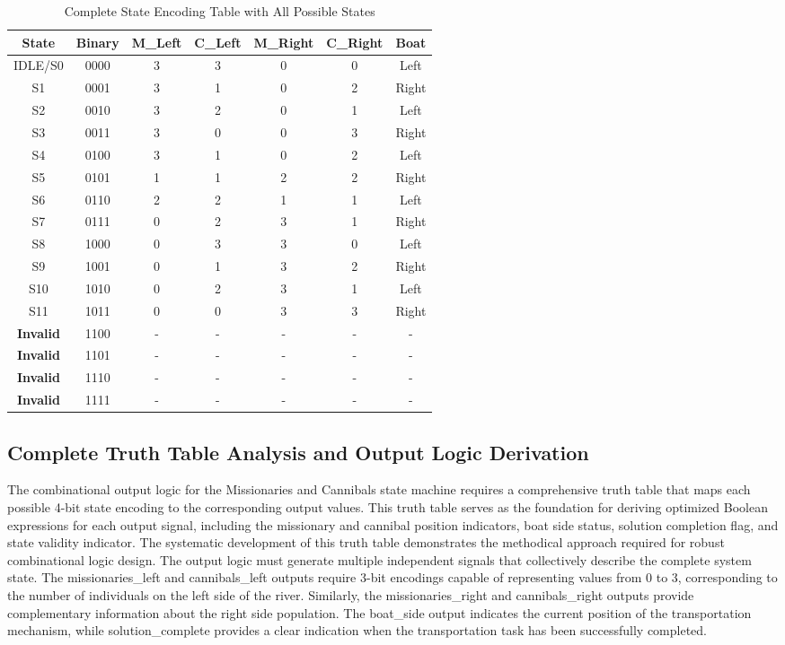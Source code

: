 \documentclass[10pt,a4paper]{article}
\begin{document}
\begin{table}[H]
\centering
\begin{tabular}{|c|c|c|c|c|c|c|}
\hline
\textbf{State} & \textbf{Binary} & \textbf{M\_Left} & \textbf{C\_Left} & \textbf{M\_Right} & \textbf{C\_Right} & \textbf{Boat} \\
\hline
IDLE/S0 & 0000 & 3 & 3 & 0 & 0 & Left \\
S1 & 0001 & 3 & 1 & 0 & 2 & Right \\
S2 & 0010 & 3 & 2 & 0 & 1 & Left \\
S3 & 0011 & 3 & 0 & 0 & 3 & Right \\
S4 & 0100 & 3 & 1 & 0 & 2 & Left \\
S5 & 0101 & 1 & 1 & 2 & 2 & Right \\
S6 & 0110 & 2 & 2 & 1 & 1 & Left \\
S7 & 0111 & 0 & 2 & 3 & 1 & Right \\
S8 & 1000 & 0 & 3 & 3 & 0 & Left \\
S9 & 1001 & 0 & 1 & 3 & 2 & Right \\
S10 & 1010 & 0 & 2 & 3 & 1 & Left \\
S11 & 1011 & 0 & 0 & 3 & 3 & Right \\
\textbf{Invalid} & 1100 & - & - & - & - & - \\
\textbf{Invalid} & 1101 & - & - & - & - & - \\
\textbf{Invalid} & 1110 & - & - & - & - & - \\
\textbf{Invalid} & 1111 & - & - & - & - & - \\
\hline
\end{tabular}
\caption{Complete State Encoding Table with All Possible States}
\end{table}

\subsection*{Complete Truth Table Analysis and Output Logic Derivation}

The combinational output logic for the Missionaries and Cannibals state machine requires a comprehensive truth table that maps each possible 4-bit state encoding to the corresponding output values. This truth table serves as the foundation for deriving optimized Boolean expressions for each output signal, including the missionary and cannibal position indicators, boat side status, solution completion flag, and state validity indicator. The systematic development of this truth table demonstrates the methodical approach required for robust combinational logic design. The output logic must generate multiple independent signals that collectively describe the complete system state. The missionaries\_left and cannibals\_left outputs require 3-bit encodings capable of representing values from 0 to 3, corresponding to the number of individuals on the left side of the river. Similarly, the missionaries\_right and cannibals\_right outputs provide complementary information about the right side population. The boat\_side output indicates the current position of the transportation mechanism, while solution\_complete provides a clear indication when the transportation task has been successfully completed.
\end{document}
